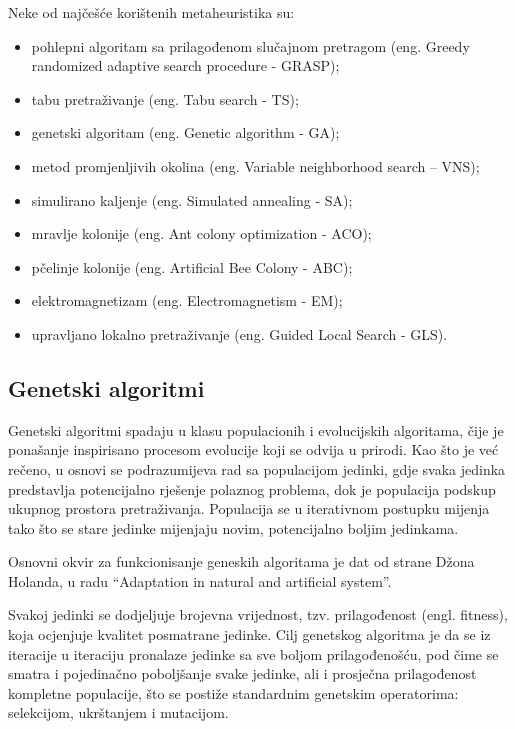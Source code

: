 \documentclass[a4paper, utf8, 11pt, colorlinks]{book}
\begin{document}
 Neke od najčešće korištenih metaheuristika su:
 \begin{itemize}
 	\item pohlepni algoritam sa prilagođenom slučajnom pretragom (eng. Greedy randomized adaptive search procedure - GRASP);
 	\item tabu pretraživanje (eng. Tabu search - TS);
 	\item genetski algoritam (eng. Genetic algorithm - GA);
 	\item metod promjenljivih okolina (eng. Variable neighborhood search – VNS);
 	\item simulirano kaljenje (eng. Simulated annealing - SA);
 	\item mravlje kolonije (eng. Ant colony optimization - ACO);
 	\item pčelinje kolonije (eng. Artificial Bee Colony - ABC);
 	\item elektromagnetizam (eng. Electromagnetism - EM);
 	\item upravljano lokalno pretraživanje (eng. Guided Local Search - GLS).
 \end{itemize}


\subsection{Genetski algoritmi}\label{intro:ga}


Genetski algoritmi spadaju u klasu populacionih i evolucijskih algoritama, čije je ponašanje inspirisano procesom evolucije koji se odvija u prirodi.
Kao što je već rečeno, u osnovi se podrazumijeva rad sa populacijom jedinki, gdje svaka jedinka predstavlja potencijalno rješenje polaznog problema, dok je populacija  podskup ukupnog prostora pretraživanja. Populacija se u iterativnom postupku mijenja tako što se stare jedinke mijenjaju novim, potencijalno boljim jedinkama.

Osnovni okvir za funkcionisanje geneskih algoritama je dat od strane Džona Holanda, u radu ``Adaptation in natural and artificial system''.

Svakoj jedinki se dodjeljuje brojevna vrijednost, tzv. prilagođenost (engl.  fitness), koja ocjenjuje kvalitet posmatrane jedinke. Cilj genetskog algoritma je da se iz iteracije u iteraciju pronalaze jedinke sa sve boljom prilagođenošću, pod čime se smatra i pojedinačno poboljšanje svake jedinke, ali i prosječna prilagođenost kompletne populacije, što se postiže standardnim genetskim operatorima: selekcijom, ukrštanjem i mutacijom.
\end{document}
